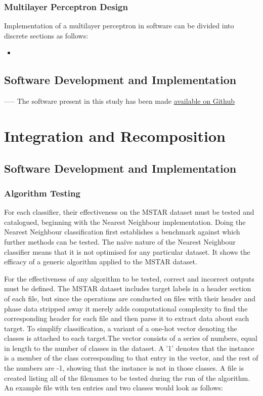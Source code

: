 \subsubsection{Multilayer Perceptron Design}

Implementation of a multilayer perceptron in software can be divided into discrete sections as follows:
\begin{itemize}
	\item
	
	
	
	
\end{itemize}


\subsection{Software Development and Implementation}




-----
The software present in this study has been made \href{http://github.com/roansong}{available on Github}

\section{Integration and Recomposition}
\subsection{Software Development and Implementation}
\subsubsection{Algorithm Testing}
For each classifier, their effectiveness on the MSTAR dataset must be tested and catalogued, beginning with the Nearest Neighbour implementation. Doing the Nearest Neighbour classification first establishes a benchmark against which further methods can be tested. The na{\"i}ve nature of the Nearest Neighbour classifier means that it is not optimised for any particular dataset. It shows the efficacy of a generic algorithm applied to the MSTAR dataset.

For the effectiveness of any algorithm to be tested, correct and incorrect outputs must be defined. The MSTAR dataset includes target labels in a header section of each file, but since the operations are conducted on files with their header and phase data stripped away it merely adds computational complexity to find the corresponding header for each file and then parse it to extract data about each target. To simplify classification, a variant of a one-hot vector denoting the classes is attached to each target.The vector consists of a series of numbers, equal in length to the number of classes in the dataset. A '1' denotes that the instance is a member of the class corresponding to that entry in the vector, and the rest of the numbers are -1, showing that the instance is not in those classes. A file is created listing all of the filenames to be tested during the run of the algorithm. An example file with ten entries and two classes would look as follows:\\

